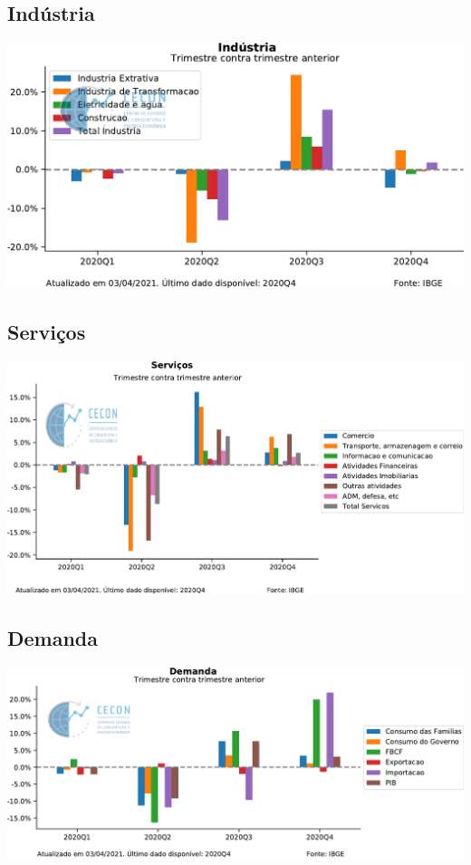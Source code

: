\documentclass{SelfArx}
\begin{document}
\subsection*{Indústria}
\label{sec:org0d665a2}

\begin{center}
\includegraphics[width=.9\linewidth]{./figs/PIB/Industria.pdf}
\end{center}


\subsection*{Serviços}
\label{sec:orgba6f549}

\begin{center}
\includegraphics[width=.9\linewidth]{./figs/PIB/Servicos.pdf}
\end{center}

\subsection*{Demanda}
\label{sec:org2557e95}

\begin{center}
\includegraphics[width=.9\linewidth]{./figs/PIB/Demanda.pdf}
\end{center}
\end{document}
